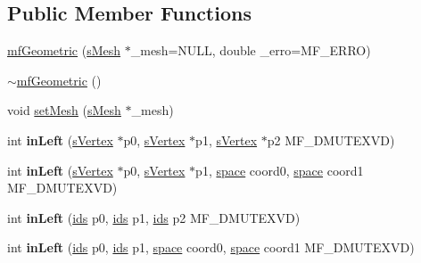\subsection*{Public Member Functions}
\begin{DoxyCompactItemize}
\item 
\hyperlink{classmf_1_1mfGeometric_a80e5d1b4e9e47785128e576554fc0323}{mfGeometric} (\hyperlink{classmf_1_1mfGeometric_a36b13b57c06fda7c04e3202ad1dae4d2}{sMesh} $\ast$\_\-mesh=NULL, double \_\-erro=MF\_\-ERRO)
\item 
\hyperlink{classmf_1_1mfGeometric_a7ec6a2f8930e7d7020acb33e1d895f76}{$\sim$mfGeometric} ()
\item 
void \hyperlink{classmf_1_1mfGeometric_a2f47c5feb979cf56cd502e621dbab584}{setMesh} (\hyperlink{classmf_1_1mfGeometric_a36b13b57c06fda7c04e3202ad1dae4d2}{sMesh} $\ast$\_\-mesh)
\item 
\hypertarget{classmf_1_1mfGeometric_a4dccc2510e7436b910a84dfcb87182ce}{
int {\bfseries inLeft} (\hyperlink{classmf_1_1mfGeometric_a6195106d9ab499c9c59532d804d6eacf}{sVertex} $\ast$p0, \hyperlink{classmf_1_1mfGeometric_a6195106d9ab499c9c59532d804d6eacf}{sVertex} $\ast$p1, \hyperlink{classmf_1_1mfGeometric_a6195106d9ab499c9c59532d804d6eacf}{sVertex} $\ast$p2 MF\_\-DMUTEXVD)}
\label{classmf_1_1mfGeometric_a4dccc2510e7436b910a84dfcb87182ce}

\item 
\hypertarget{classmf_1_1mfGeometric_a3846317c8b191d4ce4b836cd7c7ceda9}{
int {\bfseries inLeft} (\hyperlink{classmf_1_1mfGeometric_a6195106d9ab499c9c59532d804d6eacf}{sVertex} $\ast$p0, \hyperlink{classmf_1_1mfGeometric_a6195106d9ab499c9c59532d804d6eacf}{sVertex} $\ast$p1, \hyperlink{classmf_1_1mfGeometric_a03504b73c011add763229b5bae6e137c}{space} coord0, \hyperlink{classmf_1_1mfGeometric_a03504b73c011add763229b5bae6e137c}{space} coord1 MF\_\-DMUTEXVD)}
\label{classmf_1_1mfGeometric_a3846317c8b191d4ce4b836cd7c7ceda9}

\item 
\hypertarget{classmf_1_1mfGeometric_a6a70182d43e4e1c6a22202db7f26f301}{
int {\bfseries inLeft} (\hyperlink{classmf_1_1mfGeometric_a15bbb64e3b03482d20c82fa2d4b68e56}{ids} p0, \hyperlink{classmf_1_1mfGeometric_a15bbb64e3b03482d20c82fa2d4b68e56}{ids} p1, \hyperlink{classmf_1_1mfGeometric_a15bbb64e3b03482d20c82fa2d4b68e56}{ids} p2 MF\_\-DMUTEXVD)}
\label{classmf_1_1mfGeometric_a6a70182d43e4e1c6a22202db7f26f301}

\item 
\hypertarget{classmf_1_1mfGeometric_a810decfaa701bde3a90a1899ad23f291}{
int {\bfseries inLeft} (\hyperlink{classmf_1_1mfGeometric_a15bbb64e3b03482d20c82fa2d4b68e56}{ids} p0, \hyperlink{classmf_1_1mfGeometric_a15bbb64e3b03482d20c82fa2d4b68e56}{ids} p1, \hyperlink{classmf_1_1mfGeometric_a03504b73c011add763229b5bae6e137c}{space} coord0, \hyperlink{classmf_1_1mfGeometric_a03504b73c011add763229b5bae6e137c}{space} coord1 MF\_\-DMUTEXVD)}
\label{classmf_1_1mfGeometric_a810decfaa701bde3a90a1899ad23f291}


\end{DoxyCompactItemize}
